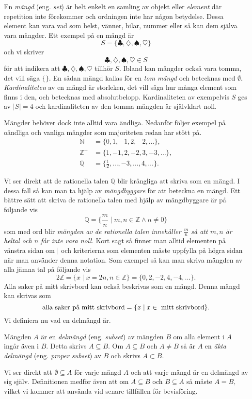 \documentclass{article}
\theoremstyle{definition}
\begin{document}
En \textit{mängd} (eng. \textit{set}) är helt enkelt en samling av objekt eller \textit{element} där repetition 
inte förekommer och ordningen inte har någon betydelse.
Dessa element kan vara vad som helst, vänner, bilar, nummer eller så kan dem själva vara mängder. 
Ett exempel på en mängd är 
\[S = \{\clubsuit, \diamondsuit, \spadesuit, \heartsuit\}\]
och vi skriver
\[\clubsuit, \diamondsuit, \spadesuit, \heartsuit \in S\]
för att indikera att $\clubsuit, \diamondsuit, \spadesuit, \heartsuit$ tillhör $S$.
Ibland kan mängder också vara tomma, det vill säga $\{ \}$. En sådan mängd kallas för en \textit{tom mängd} och 
betecknas med $\emptyset$. \textit{Kardinaliteten} av en mängd är storleken, det vill säga 
hur många element som finns i den, och betecknas med absolutbelopp. 
Kardinaliteten av exempelvis $S$ ges av
$|S| = 4$ och kardinaliteten av den tomma mängden är självklart noll. 

Mängder behöver dock inte alltid vara ändliga. 
Nedanför följer exempel på oändliga och vanliga mängder som majoriteten redan har 
stött på.
\begin{align*}
    \mathbb{N} & = \{0, 1, -1, 2, -2, \ldots \}, \\
    \mathbb{Z^+} & = \{1, -1, 2, -2, 3, -3, \ldots \}, \\
    \mathbb{Q} & = \{\frac{1}{2}, \ldots, -3, \ldots, 4, \ldots \}.
\end{align*}

Vi ser direkt att de rationella talen $\mathbb{Q}$ blir krångliga att skriva som en mängd. I 
dessa fall så kan man ta hjälp av \textit{mängdbyggare} för att beteckna en mängd. 
Ett bättre sätt 
att skriva de rationella talen med hjälp av mängdbyggare är på följande vis
\[ \mathbb{Q} = \biggl\{ \frac{m}{n} \; \biggl| \; m, n \in \mathbb{Z} \land n \neq 0 \biggl\}\]
som med ord blir \textit{mängden av de rationella talen innehåller $\frac{m}{n}$ så att $m, n$ är heltal och 
$n$ får inte vara noll.} Kort sagt så finner man
alltid elementen på vänstra sidan om $|$ och kriterierna som elementen måste uppfylla på högra sidan när man 
använder denna notation. Som exempel så kan man skriva mängden av alla jämna tal på följande vis
\[2 \mathbb{Z} = \{x \; | \; x = 2n, n \in \mathbb{Z}\} = \{0, 2, -2, 4, -4, \ldots\}.\]
Alla saker på mitt skrivbord kan också beskrivas som en mängd. Denna mängd kan skrivas som
\[ \textnormal{alla saker på mitt skrivbord} = \{x \; | \; x \in \textnormal{ mitt skrivbord}\}. \]
Vi definiera nu vad en delmängd är.

\begin{mydef}{}{}
  Mängden $A$ är en \textit{delmängd} (eng. \textit{subset}) av mängden $B$ om alla element i $A$ ingår även i $B$. Detta skrivs 
  $A \subseteq B$. Om $A \subseteq B$ och $A \neq B$ så är $A$ en \textit{äkta delmängd} (eng. \textit{proper subset}) av $B$ och skrivs
  $A \subset B$.
\end{mydef}
Vi ser direkt att $\emptyset \subseteq A$ för varje mängd $A$ och att varje mängd är en delmängd av 
sig själv. Definitionen medför även att om 
$A \subseteq B$ och $B \subseteq A$ så måste $A = B$, vilket vi kommer att använda vid senare tillfällen för bevisföring. 
\end{document}
